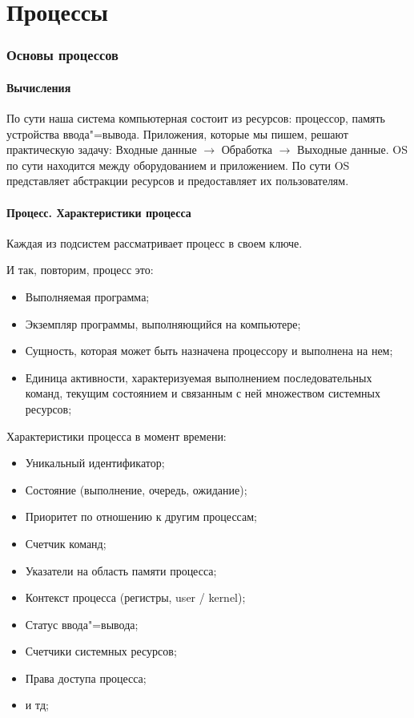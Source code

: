 \documentclass[bachelor, och, book]{SCWorks}
\theoremstyle{remark}
\begin{document}
    \part{Процессы}

    \section{Основы процессов}

    \subsection{Вычисления}

    По сути наша система компьютерная состоит из ресурсов: процессор, память устройства ввода"=вывода. Приложения, которые мы пишем, решают практическую задачу: Входные данные $\rightarrow$ Обработка $\rightarrow$ Выходные данные. OS по сути находится между оборудованием и приложением. По сути OS представляет абстракции ресурсов и предоставляет их пользователям.


    \subsection{Процесс. Характеристики процесса}
    
    Каждая из подсистем рассматривает процесс в своем ключе.
    
    \hfill \break
    И так, повторим, процесс это: 

    \begin{itemize}[label=$\bullet$]
        \item Выполняемая программа;
        \item Экземпляр программы, выполняющийся на компьютере;
        \item Сущность, которая может быть назначена процессору и выполнена на нем;
        \item Единица активности, характеризуемая выполнением последовательных команд, текущим состоянием и связанным с ней множеством системных ресурсов;
    \end{itemize}

    \hfill \break
    Характеристики процесса в момент времени:

    \begin{itemize}[label=$\bullet$]
        \item Уникальный идентификатор;
        \item Состояние (выполнение, очередь, ожидание);
        \item Приоритет по отношению к другим процессам;
        \item Счетчик команд;
        \item Указатели на область памяти процесса;
        \item Контекст процесса (регистры, user / kernel);
        \item Статус ввода"=вывода;
        \item Счетчики системных ресурсов;
        \item Права доступа процесса;
        \item и тд; 
    \end{itemize}
    
\end{document}
